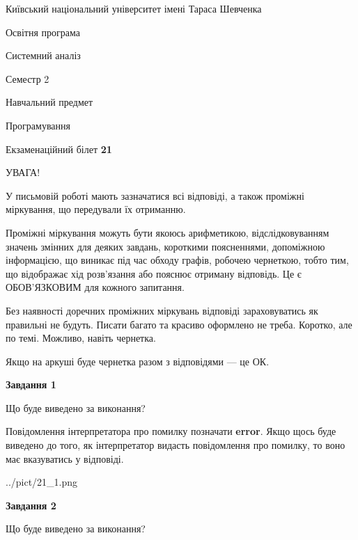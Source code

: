\documentclass[12pt, ukrainian]{article}
\begin{document}
{{\begin {small}\par
{ \center  Київський національний університет імені Тараса Шевченка \par}
{\parbox {5 cm}{Освітня програма \hfill}{\parbox {7 cm}{Системний аналіз \hfill}}\parbox {6 cm}{\hfill Семестр 2}}\par
{\parbox {5 cm} {Навчальний предмет \hfill}\parbox {7 cm}{Програмування \hfill}\parbox {6cm}{\hfill}\par}\vspace{-7pt} \end{small}}{\center Екзаменаційний білет \No \textbf
{ 21 }\par}}
{
\begin {large}
УВАГА!

У письмовій роботі мають зазначатися всі відповіді, а також проміжні міркування, що передували їх отриманню.

Проміжні міркування можуть бути якоюсь арифметикою, відслідковуванням зна\-чень змінних для деяких завдань,
короткими поясненнями, допоміжною інформацією, що виникає під час обходу графів, робочею чернеткою,
тобто тим, що відображає хід розв’язання або пояснює отриману відповідь.
Це є ОБОВ’ЯЗКОВИМ для кожного запитання.

Без наявності доречних проміжних міркувань відповіді зараховуватись як правиль\-ні не будуть.
Писати багато та красиво оформлено не треба. Коротко, але по темі. Можли\-во, навіть чернетка.

Якщо на аркуші буде чернетка разом з відповідями --- це ОК.

\newpage

{\begin {center}\textbf{Завдання 1}\end {center}}\par
Що буде виведено за виконання?

Повідомлення інтерпретатора про помилку позначати \textbf{error}.
Якщо щось буде виведено до того, як інтерпретатор видасть повідомлення про помилку, 
то воно має вказуватись у відповіді. \par


\begin{center}
	{../pict/21_1.png}
\end{center}
\newpage

{\begin {center}\textbf{Завдання 2}\end {center}}\par
Що буде виведено за виконання?


\end{large}}
\end{document}
